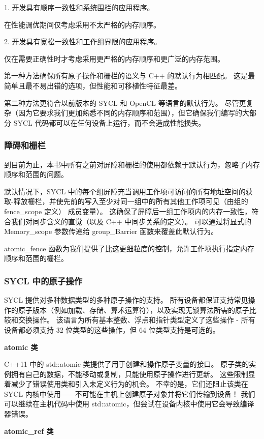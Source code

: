 1. 开发具有顺序一致性和系统围栏的应用程序。

在性能调优期间仅考虑采用不太严格的内存顺序。

2. 开发具有宽松一致性和工作组界限的应用程序。

仅在需要正确性时才考虑采用更严格的内存顺序和更广泛的内存范围。

第一种方法确保所有原子操作和栅栏的语义与 C++ 的默认行为相匹配。 这是最简单且最不易出错的选项，但性能和可移植性特征最差。

第二种方法更符合以前版本的 SYCL 和 OpenCL 等语言的默认行为。 尽管更复杂（因为它要求我们更加熟悉不同的内存顺序和范围），但它确保我们编写的大部分 SYCL 代码都可以在任何设备上运行，而不会造成性能损失。

\subsubsection{障碍和栅栏}
到目前为止，本书中所有之前对屏障和栅栏的使用都依赖于默认行为，忽略了内存顺序和范围的问题。

默认情况下，SYCL 中的每个组屏障充当调用工作项可访问的所有地址空间的获取-释放栅栏，并使先前的写入至少对同一组中的所有其他工作项可见（由组的 fence\_scope 定义） 成员变量）。 这确保了屏障后一组工作项内的内存一致性，符合我们对同步含义的直觉（以及 C++ 中同步关系的定义）。 可以通过将显式的 Memory\_scope 参数传递给 group\_Barrier 函数来覆盖此默认行为。

atomic\_fence 函数为我们提供了比这更细粒度的控制，允许工作项执行指定内存顺序和范围的栅栏。

\subsubsection{SYCL 中的原子操作}
SYCL 提供对多种数据类型的多种原子操作的支持。 所有设备都保证支持常见操作的原子版本（例如加载、存储、算术运算符），以及实现无锁算法所需的原子比较和交换操作。 该语言为所有基本整数、浮点和指针类型定义了这些操作 - 所有设备都必须支持 32 位类型的这些操作，但 64 位类型支持是可选的。

\textbf{atomic 类}

C++11 中的 std::atomic 类提供了用于创建和操作原子变量的接口。 原子类的实例拥有自己的数据，不能移动或复制，只能使用原子操作进行更新。 这些限制显着减少了错误使用类和引入未定义行为的机会。 不幸的是，它们还阻止该类在 SYCL 内核中使用——不可能在主机上创建原子对象并将它们传输到设备！ 我们可以继续在主机代码中使用 std::atomic，但尝试在设备内核中使用它会导致编译器错误。

\textbf{atomic\_ref 类}

